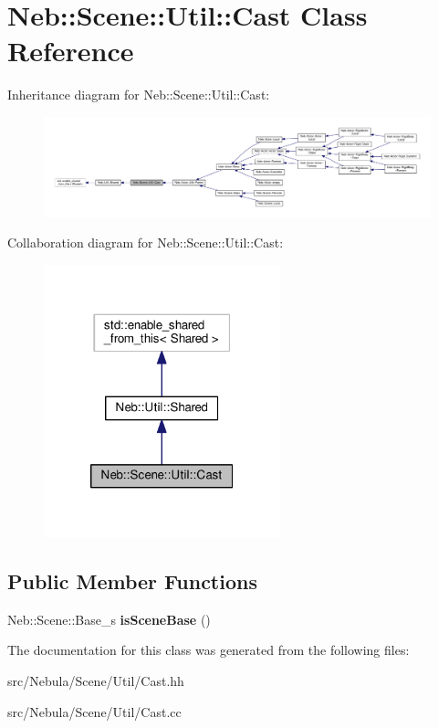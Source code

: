 \hypertarget{classNeb_1_1Scene_1_1Util_1_1Cast}{\section{Neb\-:\-:Scene\-:\-:Util\-:\-:Cast Class Reference}
\label{classNeb_1_1Scene_1_1Util_1_1Cast}
}


Inheritance diagram for Neb\-:\-:Scene\-:\-:Util\-:\-:Cast\-:
\nopagebreak
\begin{figure}[H]
\begin{center}
\leavevmode
\includegraphics[width=350pt]{classNeb_1_1Scene_1_1Util_1_1Cast__inherit__graph}
\end{center}
\end{figure}


Collaboration diagram for Neb\-:\-:Scene\-:\-:Util\-:\-:Cast\-:
\nopagebreak
\begin{figure}[H]
\begin{center}
\leavevmode
\includegraphics[width=194pt]{classNeb_1_1Scene_1_1Util_1_1Cast__coll__graph}
\end{center}
\end{figure}
\subsection*{Public Member Functions}
\begin{DoxyCompactItemize}
\item 
\hypertarget{classNeb_1_1Scene_1_1Util_1_1Cast_a53c12edc6e698f1f5f4889fc54f4f9ee}{Neb\-::\-Scene\-::\-Base\-\_\-s {\bfseries is\-Scene\-Base} ()}\label{classNeb_1_1Scene_1_1Util_1_1Cast_a53c12edc6e698f1f5f4889fc54f4f9ee}

\end{DoxyCompactItemize}


The documentation for this class was generated from the following files\-:\begin{DoxyCompactItemize}
\item 
src/\-Nebula/\-Scene/\-Util/Cast.\-hh\item 
src/\-Nebula/\-Scene/\-Util/Cast.\-cc\end{DoxyCompactItemize}
